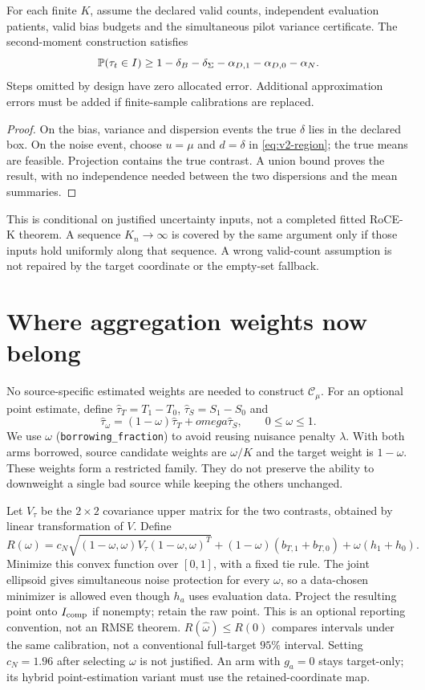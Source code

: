 \begin{proposition}
For each finite $K$, assume the declared valid counts, independent evaluation
patients, valid bias budgets and the simultaneous pilot variance certificate.
The second-moment construction satisfies
\[
 \mathbb P(\tau_t\in I)\ge
 1-\delta_B-\delta_\Sigma-\alpha_{D,1}-\alpha_{D,0}-\alpha_N.
\]
Steps omitted by design have zero allocated error. Additional approximation
errors must be added if finite-sample calibrations are replaced.
\end{proposition}
\begin{proof}
On the bias, variance and dispersion events the true $\delta$ lies in the
declared box. On the noise event, choose $u=\mu$ and $d=\delta$ in
\eqref{eq:v2-region}; the true means are feasible. Projection contains the
true contrast. A union bound proves the result, with no independence needed
between the two dispersions and the mean summaries.
\end{proof}

This is conditional on justified uncertainty inputs, not a completed fitted
RoCE-K theorem. A sequence $K_n\to\infty$ is covered by the same argument
only if those inputs hold uniformly along that sequence. A wrong valid-count
assumption is not repaired by the target coordinate or the empty-set fallback.

\section{Where aggregation weights now belong}

No source-specific estimated weights are needed to construct
$\mathcal C_\mu$. For an optional point estimate, define
$\widehat\tau_T=T_1-T_0$, $\widehat\tau_S=S_1-S_0$ and
\[
 \widehat\tau_\omega=(1-\omega)\widehat\tau_T+omega\widehat\tau_S,
 \qquad 0\le\omega\le1.
\]
We use $\omega$ (\texttt{borrowing\_fraction}) to avoid reusing nuisance
penalty $\lambda$. With both arms borrowed, source candidate weights are
$\omega/K$ and the target weight is $1-\omega$. These weights form a
restricted family. They do not preserve the ability to downweight a single
bad source while keeping the others unchanged.

Let $V_\tau$ be the $2\times2$ covariance upper matrix for the two contrasts,
obtained by linear transformation of $V$. Define
\[
 R(\omega)=c_N\sqrt{(1-\omega,\omega)V_\tau(1-\omega,\omega)^T}
       +(1-\omega)(b_{T,1}+b_{T,0})+\omega(h_1+h_0).
\]
Minimize this convex function over $[0,1]$, with a fixed tie rule.
The joint ellipsoid gives simultaneous noise protection for every $\omega$,
so a data-chosen minimizer is allowed even though $h_a$ uses evaluation data.
Project the resulting point onto $I_{\rm comp}$ if nonempty; retain the raw
point. This is an optional reporting convention, not an RMSE theorem.
$R(\widehat\omega)\le R(0)$ compares intervals under the same calibration,
not a conventional full-target $95\%$ interval. Setting $c_N=1.96$ after
selecting $\omega$ is not justified. An arm with $g_a=0$ stays target-only;
its hybrid point-estimation variant must use the retained-coordinate map.

